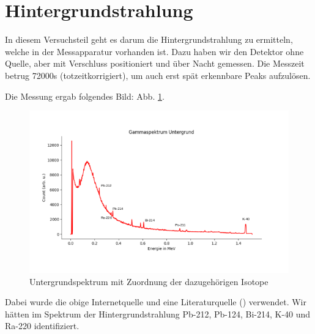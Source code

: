 \clearpage
\section{Hintergrundstrahlung}

In diesem Versuchsteil geht es darum die Hintergrundstrahlung zu ermitteln, welche in der Messapparatur vorhanden ist. Dazu haben wir 
den Detektor ohne Quelle, aber mit Verschluss positioniert und über Nacht gemessen. Die Messzeit betrug 72000s (totzeitkorrigiert), um auch erst 
spät erkennbare Peaks aufzulösen. 

Die Messung ergab folgendes Bild: Abb. \ref{bild:untergrund}.

\begin{figure}[ht]
    \captionsetup{justification=centering,margin=2cm}
    \centering
    \includegraphics[angle = 90]{Bilder/Auswertung/Untergrund.png}
    \caption{Untergrundspektrum mit Zuordnung der dazugehörigen Isotope \protect \footnotemark}
    \label{bild:untergrund}
\end{figure}
Dabei wurde die obige Internetquelle und eine Literaturquelle (\cite{Mende2016}) verwendet.
Wir hätten im Spektrum der Hintergrundstrahlung Pb-212, Pb-124, Bi-214, K-40 und Ra-220 identifiziert.